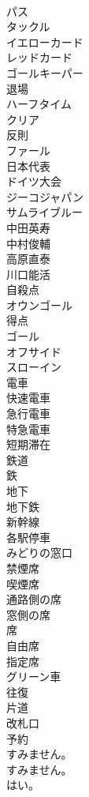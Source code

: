 \documentclass[8pt]{extreport}
\begin{document}
\begin{CJK}{UTF8}{min}
\\	パス
\\	タックル
\\	イエローカード
\\	レッドカード
\\	ゴールキーパー
\\	退場
\\	ハーフタイム
\\	クリア
\\	反則
\\	ファール
\\	日本代表
\\	ドイツ大会
\\	ジーコジャパン
\\	サムライブルー
\\	中田英寿
\\	中村俊輔
\\	高原直泰
\\	川口能活
\\	自殺点
\\	オウンゴール
\\	得点
\\	ゴール
\\	オフサイド
\\	スローイン
\\	電車
\\	快速電車
\\	急行電車
\\	特急電車
\\	短期滞在
\\	鉄道
\\	鉄
\\	地下
\\	地下鉄
\\	新幹線
\\	各駅停車
\\	みどりの窓口
\\	禁煙席
\\	喫煙席
\\	通路側の席
\\	窓側の席
\\	席
\\	自由席
\\	指定席
\\	グリーン車
\\	往復
\\	片道
\\	改札口
\\	予約
\\	すみません。	
\\	すみません。 
\\	はい。	

\end{CJK}
\end{document}
